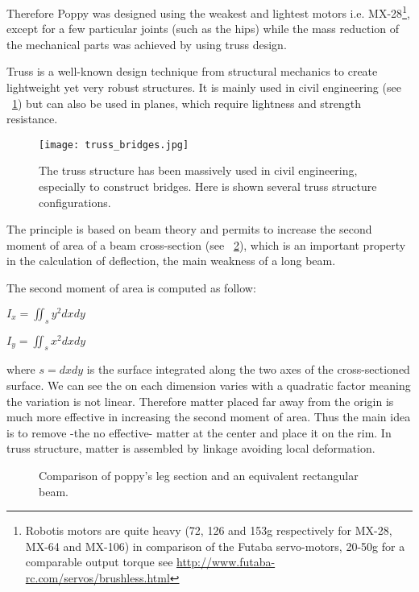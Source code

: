 Therefore Poppy was designed using the weakest and lightest motors i.e. MX-28\footnote{Robotis motors are quite heavy (72, 126 and 153g respectively for MX-28, MX-64 and MX-106) in comparison of the Futaba servo-motors, 20-50g for a comparable output torque see \url{http://www.futaba-rc.com/servos/brushless.html}}, except for a few particular joints (such as the hips) while the mass reduction of the mechanical parts was achieved by using truss design.

Truss is a well-known design technique from structural mechanics to create lightweight yet very robust structures. It is mainly used in civil engineering (see \figurename~\ref{fig:truss_bridges}) but can also be used in planes, which require lightness and strength resistance.

\begin{figure}[tb]
    \begin{center}
        \texttt{[image: truss\_bridges.jpg]}
    \end{center}
    \caption{The truss structure has been massively used in civil engineering, especially to construct bridges. Here is shown several truss structure configurations.}
    \label{fig:truss_bridges}
\end{figure}


The principle is based on beam theory and permits to increase the second moment of area of a beam cross-section (see \figurename~\ref{fig:leg_section}), which is an important property in the calculation of deflection, the main weakness of a long beam.

The second moment of area is computed as follow:
\begin{center}
    $I_x = \iint_s y^2 dxdy$

    $I_y = \iint_s x^2 dxdy$
\end{center}
where $s = dxdy$ is the surface integrated along the two axes of the cross-sectioned surface. We can see the  on each dimension varies with a quadratic factor meaning the variation is not linear. Therefore matter placed far away from the origin is much more effective in increasing the second moment of area.
Thus the main idea is to remove -the no effective- matter at the center and place it on the rim. In truss structure, matter is assembled by linkage avoiding local deformation.

\begin{figure}[!ht]
\centering
    \hfil
    \caption{Comparison of poppy's leg section and an equivalent rectangular beam.}
    \label{fig:leg_section}
\end{figure}

